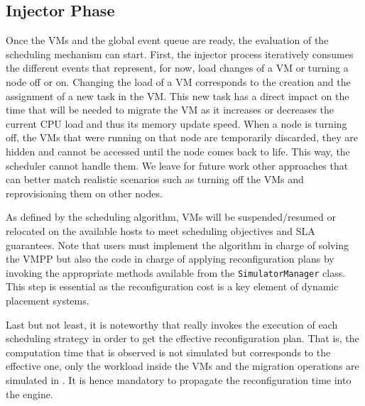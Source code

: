 \subsection{Injector Phase}

Once the VMs and the global event queue are ready, the evaluation of
the scheduling mechanism can start. First, the injector process
iteratively consumes the different events that represent, for now,
load changes of a VM or turning a node off or on. Changing the load of
a VM corresponds to the creation and the assignment of a new \sg task
in the VM. This new task has a direct impact on the time that will be
needed to migrate the VM as it increases or decreases the current CPU
load and thus%
its memory update speed.
When a node is turning off, the VMs that were running on that node are
temporarily discarded, \ie they are hidden and cannot be accessed
until the node comes back to life. This way, the scheduler cannot
handle them.
We leave for future work other approaches that can better
match realistic scenarios such as turning off the VMs and
reprovisioning them on other nodes.
%

As defined by the scheduling algorithm, VMs will be suspended/resumed
or relocated on the available hosts to meet scheduling objectives and
SLA guarantees.  Note that users must implement the algorithm in
charge of solving the VMPP but also the code in charge of applying
reconfiguration plans by invoking the appropriate methods available
from the \texttt{SimulatorManager} class. This step is essential as
the reconfiguration cost is a key element of dynamic placement
systems.

Last but not least, it is noteworthy that \vmps really invokes the
execution of each scheduling strategy in order to get the effective
reconfiguration plan.  That is, the computation time that is observed
is not simulated but corresponds to the effective one, only the
workload inside the VMs and the migration operations are simulated in
\sg. It is hence mandatory to propagate the reconfiguration time into
the \sg engine.%

